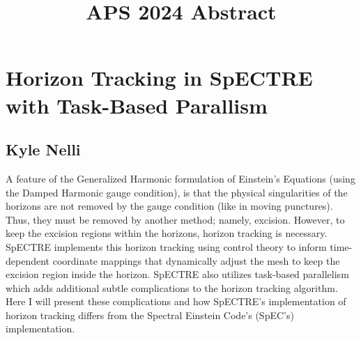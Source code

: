 \documentclass[12pt]{article}
\title{APS 2024 Abstract}
\author{\vspace{-5ex}}
\date{\vspace{-5ex}}
\begin{document}
\maketitle

\section*{Horizon Tracking in SpECTRE with Task-Based Parallism}

\subsection*{Kyle Nelli}

A feature of the Generalized Harmonic formulation of Einstein's Equations (using the Damped Harmonic gauge condition), is that the physical singularities of the horizons are not removed by the gauge condition (like in moving punctures). Thus, they must be removed by another method; namely, excision. However, to keep the excision regions within the horizons, horizon tracking is necessary. SpECTRE implements this horizon tracking using control theory to inform time-dependent coordinate mappings that dynamically adjust the mesh to keep the excision region inside the horizon. SpECTRE also utilizes task-based parallelism which adds additional subtle complications to the horizon tracking algorithm. Here I will present these complications and how SpECTRE's implementation of horizon tracking differs from the Spectral Einstein Code's (SpEC's) implementation.
\end{document}
